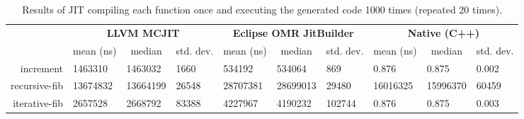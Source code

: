 \begin{table*}[t]
  \begin{tabular}{|r|l|l|l|l|l|l|l|l|l|}
  \hline
  
  \multicolumn{1}{|l|}{\multirow{2}{*}{}} 
  & \multicolumn{3}{c|}{\textbf{LLVM MCJIT}}                                                                                    
  & \multicolumn{3}{c|}{\textbf{Eclipse OMR JitBuilder}}                                                                
  & \multicolumn{3}{c|}{\textbf{Native (C++)}}                                                                              
  \\ \cline{2-10}
  
  \multicolumn{1}{|c|}{\textbf{Program}}  
  & \multicolumn{1}{c|}{mean (ns)}  %
  & \multicolumn{1}{c|}{median}  
  & \multicolumn{1}{c|}{std. dev.}                     
  & \multicolumn{1}{c|}{mean (ns)}  %
  & \multicolumn{1}{c|}{median}  
  & \multicolumn{1}{c|}{std. dev.}           
  & \multicolumn{1}{c|}{mean (ns)}  %
  & \multicolumn{1}{c|}{median}  
  & \multicolumn{1}{c|}{std. dev.}                        
  \\ \hline
  
  increment                               
  & \num{1463310} %
  & \num{1463032}                
  & \num{1660}                                        
  & \num{534192}  %
  & \num{534064}                 
  & \num{869}                                
  & \num{0.876}    %
  & \num{0.875}                   
  & \num{0.002}                                
  \\ \hline
  
  recursive-fib                           
  & \num{13674832}  %
  & \num{13664199}               
  & \num{26548}                                        
  & \num{28707381}  %
  & \num{28699013}               
  & \num{29480}                               
  & \num{16016325}  %
  & \num{15996370}               
  & \num{60459}  
  \\ \hline
  
  iterative-fib                           
  & \num{2657528}   %
  & \num{2668792}                
  & \num{83388}                                        
  & \num{4227967}   %
  & \num{4190232}                
  & \num{102744}                              
  & \num{0.876}     %
  & \num{0.875}                  
  & \num{0.003}                                
  \\ \hline
  \end{tabular}
  \caption{Results of JIT compiling each function once and executing the generated code 1000 times (repeated 20 times).}
  \label{tab:1k_time_with_one_compile}
\end{table*}

